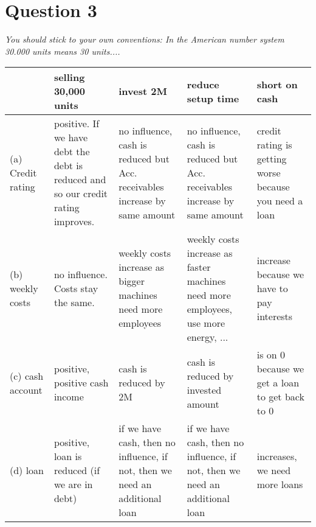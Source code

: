 \documentclass{article}
\begin{document}
	\section*{Question 3}
	\textit{You should stick to your own conventions: In the American number system 30.000 units means 30 units....}
	\begin{center}
		\begin{longtable}{l|C{3cm}|C{3cm}|C{3cm}|C{3cm}}
			& \textbf{selling 30,000 units} & \textbf{invest 2M} & \textbf{reduce setup time} & \textbf{short on cash} \\
			\hline
			(a) Credit rating & positive. If we have debt the debt is reduced and so our credit rating improves. & no influence, cash is reduced but Acc. receivables increase by same amount & no influence, cash is reduced but Acc. receivables increase by same amount & credit rating is getting worse because you need a loan \\
			\hline
			(b) weekly costs & no influence. Costs stay the same. & weekly costs increase as bigger machines need more employees & weekly costs increase as faster machines need more employees, use more energy, ... & increase because we have to pay interests \\
			\hline
			(c) cash account & positive, positive cash income & cash is reduced by 2M & cash is reduced by invested amount & is on 0 because we get a loan to get back to 0 \\
			\hline
			(d) loan & positive, loan is reduced (if we are in debt) & if we have cash, then no influence, if not, then we need an additional loan & if we have cash, then no influence, if not, then we need an additional loan & increases, we need more loans \\
		\end{longtable}
	\end{center}
	
\end{document}
